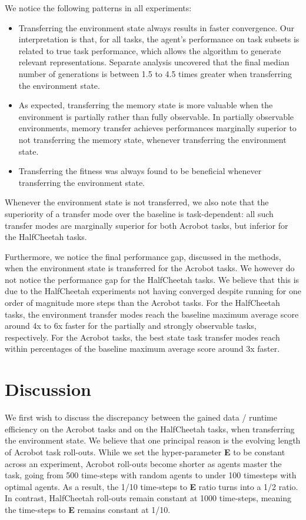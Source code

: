 \documentclass[dvipsnames,format=sigconf,anonymous=false,review=false]{acmart}
\begin{document}
We notice the following patterns in all experiments:
\begin{itemize}

\item Transferring the environment state always results in faster convergence. Our interpretation is that, for all tasks, the agent’s performance on task subsets is related to true task performance, which allows the algorithm to generate relevant representations. Separate analysis uncovered that the final median number of generations is between 1.5 to 4.5 times greater when transferring the environment state.

\item As expected, transferring the memory state is more valuable when the environment is partially rather than fully observable. In partially observable environments, memory transfer achieves performances marginally superior to not transferring the memory state, whenever transferring the environment state.

\item Transferring the fitness was always found to be beneficial whenever transferring the environment state.

\end{itemize}

Whenever the environment state is not transferred, we also note that the superiority of a transfer mode over the baseline is task-dependent: all such transfer modes are marginally superior for both Acrobot tasks, but inferior for the HalfCheetah tasks.

Furthermore, we notice the final performance gap, discussed in the methods, when the environment state is transferred for the Acrobot tasks. We however do not notice the performance gap for the HalfCheetah tasks. We believe that this is due to the HalfCheetah experiments not having converged despite running for one order of magnitude more steps than the Acrobot tasks. For the HalfCheetah tasks, the environment transfer modes reach the baseline maximum average score around 4x to 6x faster for the partially and strongly observable tasks, respectively. For the Acrobot tasks, the best state task transfer modes reach within percentages of the baseline maximum average score around 3x faster.

\section{Discussion}

We first wish to discuss the discrepancy between the gained data / runtime efficiency on the Acrobot tasks and on the HalfCheetah tasks, when transferring the environment state. We believe that one principal reason is the evolving length of Acrobot task roll-outs. While we set the hyper-parameter \textbf{E} to be constant across an experiment, Acrobot roll-outs become shorter as agents master the task, going from 500 time-steps with random agents to under 100 timesteps with optimal agents. As a result, the 1/10 time-steps to \textbf{E} ratio turns into a 1/2 ratio. In contrast, HalfCheetah roll-outs remain constant at 1000 time-steps, meaning the time-steps to \textbf{E} remains constant at 1/10.
\end{document}
